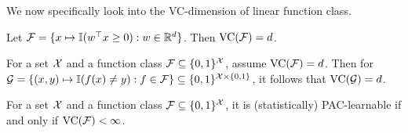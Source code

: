 \documentclass[twoside]{article}
\newcommand{\I}{\mathbb{I}}
\newcommand{\VC}{\mathrm{VC}}
\begin{document}
We now specifically look into the VC-dimension of linear function class. 
\begin{proposition}
    Let $\cF=\{x\mapsto \I(w^\top x \ge 0):w\in \R^d\}$. Then $\VC(\cF)=d$.
\end{proposition}
\begin{proposition}
    For a set $\mathcal{X}$ and a function class $\mathcal{F}\subseteq \{0,1\}^{\mathcal{X}}$, assume $\VC(\cF)=d$. Then for $\cG=\{(x,y)\mapsto \I(f(x)\neq y):f\in \cF\}\subseteq \{0,1\}^{\cX\times \{0,1\}}$, it follows that $\VC(\cG)=d$.
\end{proposition}
\begin{theorem}
    For a set $\mathcal{X}$ and a function class $\mathcal{F}\subseteq \{0,1\}^{\mathcal{X}}$, it is (statistically) PAC-learnable if and only if $\VC(\cF)<\infty$.
\end{theorem}
\end{document}
